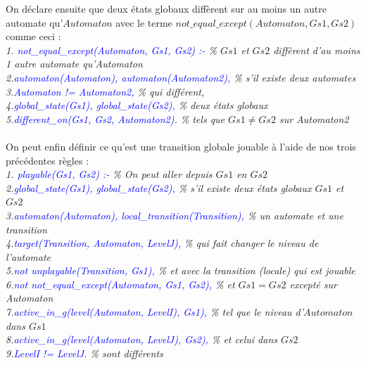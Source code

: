 \documentclass[10pt,a4paper]{article}
\begin{document}
On déclare ensuite que deux états globaux diffèrent sur au moins un autre automate qu'$Automaton$ avec le terme $not\_equal\_except(Automaton, Gs1, Gs2)$ comme ceci :\\
\emph{
1. \textcolor{blue}{not\_equal\_except(Automaton, Gs1, Gs2) :-} \% $Gs1$ et $Gs2$ diffèrent d'au moins 1 autre automate qu'Automaton \\
2.\qquad \textcolor{blue}{automaton(Automaton), automaton(Automaton2),} \% s'il existe deux automates\\
3.\qquad \textcolor{blue}{Automaton != Automaton2,} \% qui différent,\\
4.\qquad \textcolor{blue}{global\_state(Gs1), global\_state(Gs2),} \% deux états globaux\\
5.\qquad \textcolor{blue}{different\_on(Gs1, Gs2, Automaton2).} \% tels que $Gs1 \neq Gs2$ sur Automaton2\\ \\
}
On peut enfin définir ce qu'est une transition globale jouable à l'aide de nos trois précédentes règles :\\
\emph{
1. \textcolor{blue}{playable(Gs1, Gs2) :-} \% On peut aller depuis $Gs1$ en $Gs2$\\
2.\qquad \textcolor{blue}{global\_state(Gs1), global\_state(Gs2),} \% s'il existe deux états globaux $Gs1$ et $Gs2$\\
3.\qquad \textcolor{blue}{automaton(Automaton), local\_transition(Transition),} \% un automate et une transition\\
4.\qquad \textcolor{blue}{target(Transition, Automaton, LevelJ),} \% qui fait changer le niveau de l'automate\\
5.\qquad \textcolor{blue}{not unplayable(Transition, Gs1),} \% et avec la transition (locale) qui est jouable\\
6.\qquad \textcolor{blue}{not not\_equal\_except(Automaton, Gs1, Gs2),} \% et $Gs1=Gs2$ excepté sur Automaton\\
7.\qquad \textcolor{blue}{active\_in\_g(level(Automaton, LevelI), Gs1),} \% tel que le niveau d'$Automaton$ dans $Gs1$\\
8.\qquad \textcolor{blue}{active\_in\_g(level(Automaton, LevelJ), Gs2),} \% et celui dans $Gs2$\\
9.\qquad \textcolor{blue}{LevelI != LevelJ.} \% sont différents\\
}
\end{document}
